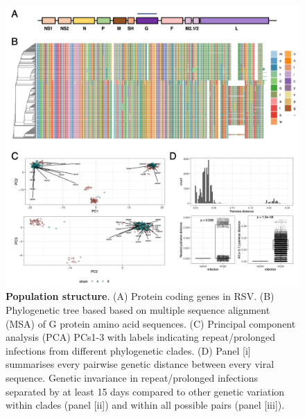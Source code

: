 \documentclass{article} %
\begin{document}
\begin{figure}[ht] \hspace{-0.5cm} 
    \includegraphics[scale=0.8]{f2}
	\caption{\textbf{Population structure}.
(A) Protein coding genes in RSV.
(B) Phylogenetic tree based based on multiple sequence alignment (MSA) of G protein amino acid sequences.
(C) Principal component analysis (PCA) PCs1-3 with labels indicating repeat/prolonged infections from different phylogenetic clades.
(D) Panel [i] summarises every pairwise genetic distance between every viral sequence.
Genetic invariance in repeat/prolonged infections separated by at least 15 days compared to other genetic variation within clades  
(panel [ii]) and within all possible pairs (panel [iii]).}
	\label{fig:2} 
\end{figure}
\clearpage
\end{document}
